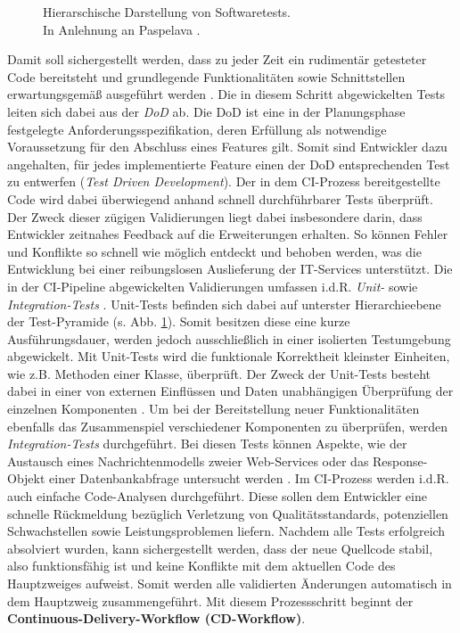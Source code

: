 \begin{center}
	\begin{figure}[H]
		\centering
		\caption[Hierarschische Darstellung von Softwaretests]{Hierarschische Darstellung von Softwaretests.\\ \hspace{0.5cm}In Anlehnung an Paspelava \cite{Exposit.2021}.}
		\label{fig:Tests}
	\end{figure}
\end{center}
\vspace*{-10mm}
Damit soll sichergestellt werden, dass zu jeder Zeit ein rudimentär getesteter Code bereitsteht und grundlegende Funktionalitäten sowie Schnittstellen erwartungsgemäß ausgeführt werden \cite[19]{Halstenberg.2020}. Die in diesem Schritt abgewickelten Tests leiten sich dabei aus der \textit{\ac{DoD}} ab. Die DoD ist eine in der Planungsphase festgelegte Anforderungsspezifikation, deren Erfüllung als notwendige Voraussetzung für den Abschluss eines Features gilt. Somit sind Entwickler dazu angehalten, für jedes implementierte Feature einen der DoD entsprechenden Test zu entwerfen (\textit{Test Driven Development}). Der in dem CI-Prozess bereitgestellte Code wird dabei überwiegend anhand schnell durchführbarer Tests überprüft. Der Zweck dieser zügigen Validierungen liegt dabei insbesondere darin, dass Entwickler zeitnahes Feedback auf die Erweiterungen erhalten. So können Fehler und Konflikte so schnell wie möglich entdeckt und behoben werden, was die Entwicklung bei einer reibungslosen Auslieferung der IT-Services unterstützt. Die in der CI-Pipeline abgewickelten Validierungen umfassen i.d.R. \textit{Unit-} sowie \textit{Integration-Tests} \cite[Kap. 1.2]{Labouardy.2021}. Unit-Tests befinden sich dabei auf unterster Hierarchieebene der Test-Pyramide (s. Abb. \ref*{fig:Tests}). Somit besitzen diese eine kurze Ausführungsdauer, werden jedoch ausschließlich in einer isolierten Testumgebung abgewickelt. Mit Unit-Tests wird die funktionale Korrektheit kleinster Einheiten, wie z.B. Methoden einer Klasse, über\-prüft. Der Zweck der Unit-Tests besteht dabei in einer von externen Einflüssen und Daten unabhängigen Überprüfung der einzelnen Komponenten \cite[Kap. 2]{Hambling.2015}. Um bei der Bereitstellung neuer Funktionalitäten ebenfalls das Zusammenspiel verschiedener Komponenten zu überprüfen, werden \textit{Integration-Tests} durchgeführt. Bei diesen Tests können Aspekte, wie der Austausch eines Nachrichtenmodells zweier Web-Services oder das Response-Objekt einer Datenbankabfrage untersucht werden \cite[Kap. 2]{Hambling.2015}. Im CI-Prozess werden i.d.R. auch einfache Code-Analysen durchgeführt. Diese sollen dem Entwickler eine schnelle Rückmeldung bezüglich Verletzung von Qualitätsstandards, potenziellen Schwachstellen sowie Leistungsproblemen liefern. Nachdem alle Tests erfolgreich absolviert wurden, kann sichergestellt werden, dass der neue Quellcode stabil, also funktionsfähig ist und keine Konflikte mit dem aktuellen Code des Hauptzweiges aufweist. Somit werden alle validierten Änderungen automatisch in dem Hauptzweig zusammengeführt. Mit diesem Prozessschritt beginnt der \textbf{Continuous-Delivery-Workflow (\acs{CD}-Workflow)}.  